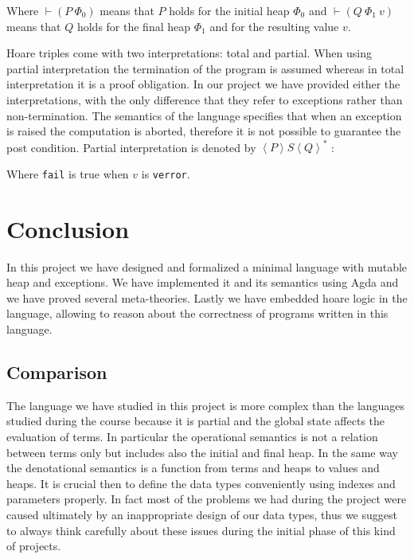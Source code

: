 \documentclass[12pt, a4paper, oneside]{article}
\newcommand{\sproof}{
  \scriptsize
  \begin{center}
  \begin{prooftree}
  \def\defaultHypSeparation{\hskip .1in}
}
\newcommand{\eproof}{
  \end{prooftree}
  \end{center}
  \normalsize
}
\begin{document}
\sproof
{}
\eproof
Where $\vdash (P\  \Phi_0)$ means that $P$ holds for the initial heap $\Phi_0$ and $\vdash (Q\ \Phi_1\ v)$ means that $Q$ holds for the final heap $\Phi_1$ and for the resulting value $v$.

Hoare triples come with two interpretations: total and partial.
When using partial interpretation the termination of the program is assumed whereas in total interpretation it is a proof obligation.
In our project we have provided either the interpretations, with the only difference that they refer to exceptions rather than non-termination.
The semantics of the language specifies that when an exception is raised the computation is aborted, therefore it is not possible to guarantee the post condition.
Partial interpretation is denoted by $ \left\langle P \right\rangle  S \left\langle Q \right\rangle^*$ :
\sproof
{}
\eproof
Where \texttt{fail} is true when $v$ is \texttt{verror}.

\section{Conclusion}
\label{sec:conclusion}
In this project we have designed and formalized a minimal language with mutable heap and exceptions. We have implemented it and its semantics using Agda and we have proved several meta-theories. 
Lastly we have embedded hoare logic  in the language, allowing to reason about the correctness of programs written in this language.

\subsection{Comparison}
The language we have studied in this project is more complex than the languages studied during the course because it is partial and the global state affects the evaluation of terms. In particular the operational semantics is not a relation between terms only but includes also the initial and final heap. In the same way the denotational semantics is a function from terms and heaps to values and heaps. It is crucial then to define the data types conveniently using indexes and parameters properly. In fact most of the problems we had during the project were caused ultimately by an inappropriate design of our data types, thus we suggest to always think carefully about these issues during the initial phase of this kind of projects.
\end{document}
